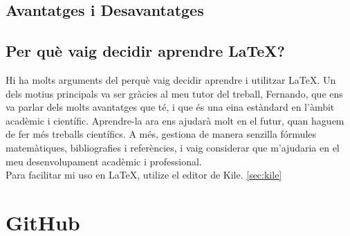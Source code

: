\subsection{Avantatges i Desavantatges}
\subsection{Per què vaig decidir aprendre LaTeX?}
Hi ha molts arguments del perquè vaig decidir aprendre i utilitzar LaTeX. Un dels motius principals va ser gràcies al meu tutor del treball, Fernando, que ens va parlar dels molts avantatges que té, i que és una eina estàndard en l’àmbit acadèmic i científic. Aprendre-la ara ens ajudarà molt en el futur, quan haguem de fer més treballs científics. A més, gestiona de manera senzilla fórmules matemàtiques, bibliografies i referències, i vaig considerar que m’ajudaria en el meu desenvolupament acadèmic i professional.\\

Para facilitar mi uso en LaTeX, utilize el editor de Kile. \ref{sec:kile}

\section{GitHub}




